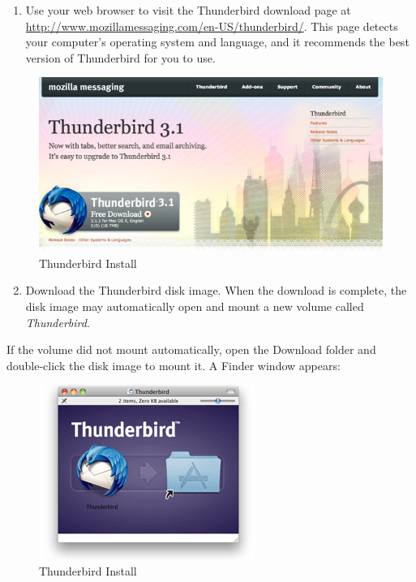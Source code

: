 \begin{enumerate}[1.]
\item
  Use your web browser to visit the Thunderbird download page at
  \href{http://www.mozillamessaging.com/en-US/thunderbird/}{http://www.mozillamessaging.com/en-US/thunderbird/}.
  This page detects your computer's operating system and language, and
  it recommends the best version of Thunderbird for you to use.
\end{enumerate}
\begin{figure}[htbp]
\centering
\includegraphics{thunderbird_inst_mac_1.jpg}
\caption{Thunderbird Install}
\end{figure}

\begin{enumerate}[1.]
\setcounter{enumi}{1}
\item
  Download the Thunderbird disk image. When the download is complete,
  the disk image may automatically open and mount a new volume called
  \emph{Thunderbird}.
\end{enumerate}
If the volume did not mount automatically, open the Download folder and
double-click the disk image to mount it. A Finder window appears:

\begin{figure}[htbp]
\centering
\includegraphics{thunderbird_inst_mac_2.jpg}
\caption{Thunderbird Install}
\end{figure}

